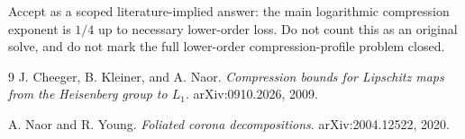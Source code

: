 \documentclass[11pt]{article}
\begin{document}
Accept as a scoped literature-implied answer: the main logarithmic compression
exponent is \(1/4\) up to necessary lower-order loss.  Do not count this as an
original solve, and do not mark the full lower-order compression-profile
problem closed.

\begin{thebibliography}{9}
J. Cheeger, B. Kleiner, and A. Naor.
\emph{Compression bounds for Lipschitz maps from the Heisenberg group to
\(L_1\)}. arXiv:0910.2026, 2009.

A. Naor and R. Young.
\emph{Foliated corona decompositions}. arXiv:2004.12522, 2020.
\end{thebibliography}
\end{document}

